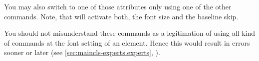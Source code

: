 You may also switch to one of those attributes only using one of the other
commands. Note, that  will activate both, the font
size and the baseline skip.

You should not misunderstand these commands as a legitimation of using all
kind of commands at the font setting of an element. Hence this would result
in errors sooner or later (see \autoref{sec:maincls-experts.experts},
).%
%
%
%
%
%
%
%
%
\fi %



